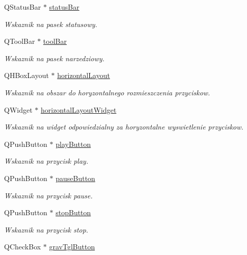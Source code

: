 \begin{DoxyCompactItemize}
Q\+Status\+Bar $\ast$ \hyperlink{class_okno_glowne_a40a10989bc6b318ac24e2457d7adb53b}{status\+Bar}
\begin{DoxyCompactList}\small\item\em Wskaznik na pasek statusowy. \end{DoxyCompactList}\item 
Q\+Tool\+Bar $\ast$ \hyperlink{class_okno_glowne_a6a37dd1f32605092fff7feac712bf429}{tool\+Bar}
\begin{DoxyCompactList}\small\item\em Wskaznik na pasek narzedziowy. \end{DoxyCompactList}\item 
Q\+H\+Box\+Layout $\ast$ \hyperlink{class_okno_glowne_aacb5ddb6d0eb560a47917cc1b457239a}{horizontal\+Layout}
\begin{DoxyCompactList}\small\item\em Wskaznik na obszar do horyzontalnego rozmieszczenia przyciskow. \end{DoxyCompactList}\item 
Q\+Widget $\ast$ \hyperlink{class_okno_glowne_a12ac2d00b9ca186176ccc710a928a723}{horizontal\+Layout\+Widget}
\begin{DoxyCompactList}\small\item\em Wskaznik na widget odpowiedzialny za horyzontalne wyswietlenie przyciskow. \end{DoxyCompactList}\item 
Q\+Push\+Button $\ast$ \hyperlink{class_okno_glowne_a50f936486c1bc3b3278823a8eb90841e}{play\+Button}
\begin{DoxyCompactList}\small\item\em Wskaznik na przycisk play. \end{DoxyCompactList}\item 
Q\+Push\+Button $\ast$ \hyperlink{class_okno_glowne_a0dde8df8a49b8f47f17f8e748fd15967}{pause\+Button}
\begin{DoxyCompactList}\small\item\em Wskaznik na przycisk pause. \end{DoxyCompactList}\item 
Q\+Push\+Button $\ast$ \hyperlink{class_okno_glowne_a3051d73dc0e0a27dc30ada43cc6b63c4}{stop\+Button}
\begin{DoxyCompactList}\small\item\em Wskaznik na przycisk stop. \end{DoxyCompactList}\item 
Q\+Check\+Box $\ast$ \hyperlink{class_okno_glowne_ae6e8681e77286aae1f4025ee5ba1ad69}{grav\+Tgl\+Button}

\end{DoxyCompactItemize}
